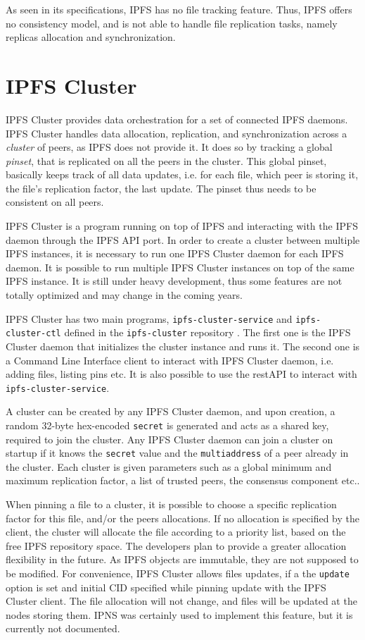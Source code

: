 \documentclass[a4paper,11pt,oneside]{report}
\begin{document}
As seen in its specifications, IPFS has no file tracking feature. Thus, IPFS offers no consistency model, and is not able to handle file replication tasks, namely replicas allocation and synchronization.

\section{IPFS Cluster}
IPFS Cluster \cite{ipfs-cluster} provides data orchestration for a set of connected IPFS daemons. IPFS Cluster handles data allocation, replication, and synchronization across a \textit{cluster} of peers, as IPFS does not provide it. It does so by tracking a global \textit{pinset}, that is replicated on all the peers in the cluster. This global pinset, basically keeps track of all data updates, i.e. for each file, which peer is storing it, the file's replication factor, the last update. The pinset thus needs to be consistent on all peers.

IPFS Cluster is a program running on top of IPFS and interacting with the IPFS daemon through the IPFS API port. In order to create a cluster between multiple IPFS instances, it is necessary to run one IPFS Cluster daemon for each IPFS daemon. It is possible to run multiple IPFS Cluster instances on top of the same IPFS instance. It is still under heavy development, thus some features are not totally optimized and may change in the coming years.

IPFS Cluster has two main programs, \texttt{ipfs-cluster-service} and \texttt{ipfs-cluster-ctl} defined in the \texttt{ipfs-cluster} repository \cite{ipfs-cluster-repo}. The first one is the IPFS Cluster daemon that initializes the cluster instance and runs it. The second one is a Command Line Interface client to interact with IPFS Cluster daemon, i.e. adding files, listing pins etc. It is also possible to use the restAPI to interact with \texttt{ipfs-cluster-service}.

A cluster can be created by any IPFS Cluster daemon, and upon creation, a random 32-byte hex-encoded \texttt{secret} is generated and acts as a shared key, required to join the cluster.
Any IPFS Cluster daemon can join a cluster on startup if it knows the \texttt{secret} value and the \texttt{multiaddress} of a peer already in the cluster. Each cluster is given parameters such as a global minimum and maximum replication factor, a list of trusted peers, the consensus component etc.\cite{cluster-config}.

When pinning a file to a cluster, it is possible to choose a specific replication factor for this file, and/or the peers allocations. If no allocation is specified by the client, the cluster will allocate the file according to a priority list, based on the free IPFS repository space. The developers plan to provide a greater allocation flexibility in the future. As IPFS objects are immutable, they are not supposed to be modified. For convenience, IPFS Cluster allows files updates, if a the \texttt{update} option is set and initial CID specified while pinning update with the IPFS Cluster client. The file allocation will not change, and files will be updated at the nodes storing them. IPNS was certainly used to implement this feature, but it is currently not documented.
\end{document}
